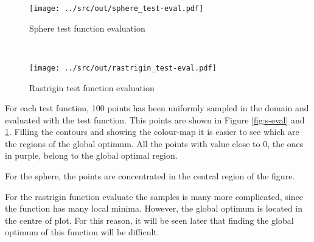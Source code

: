 \documentclass[a4paper,12pt]{article} %
\begin{document}
\begin{figure}[htb]
	\begin{minipage}[b]{.49\textwidth}
		\centering
		\texttt{[image: ../src/out/sphere\_test-eval.pdf]}	
		\caption{Sphere test function evaluation}
		\label{fig:s-eval}
	\end{minipage}
	~
	\begin{minipage}[b]{.49\textwidth}
		\centering
		\texttt{[image: ../src/out/rastrigin\_test-eval.pdf]}	
		\caption{Rastrigin test function evaluation}
		\label{fig:r-eval}
	\end{minipage}
\end{figure}

For each test function, 100 points has been uniformly sampled in the domain and evaluated with the test function. This points are shown in Figure \ref{fig:s-eval} and \ref{fig:r-eval}. 
Filling the contours and showing the colour-map it is easier to see which are the regions of the global optimum. All the points with value close to 0, the ones in purple, belong to the global optimal region.


For the sphere, the points are concentrated in the central region of the figure. 

For the rastrigin function evaluate the samples is many more complicated, since the function has many local minima. However, the global optimum is located in the centre of plot. For this reason, it will be seen later that finding the global optimum of this function will be difficult.
 



			
\end{document}
